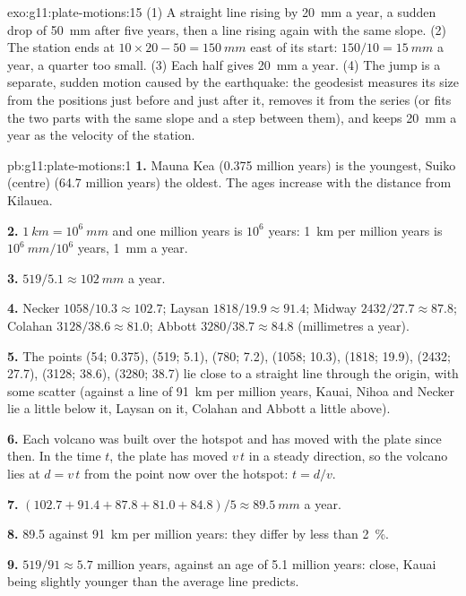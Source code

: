 \begin{solution}{exo:g11:plate-motions:15}
(1) A straight line rising by \qty{20}{mm} a year, a sudden drop of
\qty{50}{mm} after five years, then a line rising again with the same slope.
(2) The station ends at $10 \times 20 - 50 = \qty{150}{mm}$ east of its start:
$150/10 = \qty{15}{mm}$ a year, a quarter too small. (3) Each half gives
\qty{20}{mm} a year. (4) The jump is a separate, sudden motion caused by the
earthquake: the geodesist measures its size from the positions just before and
just after it, removes it from the series (or fits the two parts with the
same slope and a step between them), and keeps \qty{20}{mm} a year as the
velocity of the station.
\end{solution}

\begin{solution}{pb:g11:plate-motions:1}
\textbf{1.} Mauna Kea (\num{0.375} million years) is the youngest, Suiko
(centre) (\num{64.7} million years) the oldest. The ages increase with the
distance from Kilauea.

\textbf{2.} $\qty{1}{km} = 10^6~\unit{mm}$ and one million years is $10^6$
years: \qty{1}{km} per million years is $10^6~\unit{mm}/10^6$ years,
\qty{1}{mm} a year.

\textbf{3.} $519/5.1 \approx \qty{102}{mm}$ a year.

\textbf{4.} Necker $1058/10.3 \approx 102.7$; Laysan $1818/19.9 \approx
91.4$; Midway $2432/27.7 \approx 87.8$; Colahan $3128/38.6 \approx 81.0$;
Abbott $3280/38.7 \approx 84.8$ (millimetres a year).

\textbf{5.} The points (54; 0.375), (519; 5.1), (780; 7.2), (1058; 10.3),
(1818; 19.9), (2432; 27.7), (3128; 38.6), (3280; 38.7) lie close to a straight
line through the origin, with some scatter (against a line of \qty{91}{km} per
million years, Kauai, Nihoa and Necker lie a little below it, Laysan on it,
Colahan and Abbott a little above).

\textbf{6.} Each volcano was built over the hotspot and has moved with the
plate since then. In the time $t$, the plate has moved $v\,t$ in a steady
direction, so the volcano lies at $d = v\,t$ from the point now over the
hotspot: $t = d/v$.

\textbf{7.} $(102.7 + 91.4 + 87.8 + 81.0 + 84.8)/5 \approx \qty{89.5}{mm}$ a
year.

\textbf{8.} 89.5 against \qty{91}{km} per million years: they differ
by less than \qty{2}{\percent}.

\textbf{9.} $519/91 \approx 5.7$ million years, against an age of \num{5.1}
million years: close, Kauai being slightly younger than the average line
predicts.


\end{solution}
